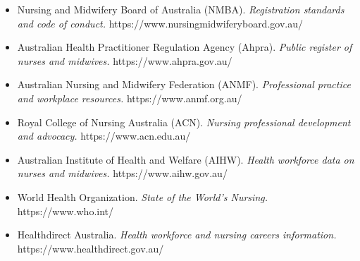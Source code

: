 \begin{itemize}
    \item Nursing and Midwifery Board of Australia (NMBA). \textit{Registration standards and code of conduct.} https://www.nursingmidwiferyboard.gov.au/
    \item Australian Health Practitioner Regulation Agency (Ahpra). \textit{Public register of nurses and midwives.} https://www.ahpra.gov.au/
    \item Australian Nursing and Midwifery Federation (ANMF). \textit{Professional practice and workplace resources.} https://www.anmf.org.au/
    \item Royal College of Nursing Australia (ACN). \textit{Nursing professional development and advocacy.} https://www.acn.edu.au/
    \item Australian Institute of Health and Welfare (AIHW). \textit{Health workforce data on nurses and midwives.} https://www.aihw.gov.au/
    \item World Health Organization. \textit{State of the World's Nursing.} https://www.who.int/
    \item Healthdirect Australia. \textit{Health workforce and nursing careers information.} https://www.healthdirect.gov.au/
\end{itemize}

\clearpage
